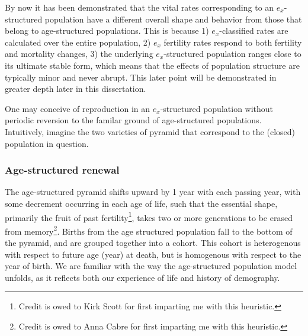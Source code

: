 
\label{sec:exstructuredrenewal}
By now it has been demonstrated that the vital rates corresponding to an
$e_x$-structured population have a different overall shape and behavior from
those that belong to age-structured populations. This is because 1) $e_x$-classified rates
are calculated over the entire population, 2) $e_x$ fertility rates respond to
both fertility and mortality changes, 3) the underlying $e_x$-structured
population ranges close to its ultimate stable form, which means that
the effects of population structure are typically minor and never abrupt. This
later point will be demonstrated in greater depth later in this dissertation.

One may conceive of reproduction in an $e_x$-structured population without
periodic reversion to the familar ground of age-structured populations.
Intuitively, imagine the two varieties of pyramid that correspond to the
(closed) population in question. 

\subsubsection{Age-structured renewal}
The age-structured pyramid shifts upward by 1 year with
each passing year, with some decrement occurring in each age of life, such that
the essential shape, primarily the fruit of past fertility\footnote{Credit is
owed to Kirk Scott for first imparting me with this heuristic.}, takes two or
more generations to be erased from memory\footnote{Credit is
owed to Anna Cabre for first imparting me with this heuristic.}. Births from the
age structured population fall to the bottom of the pyramid, and are grouped 
together into a cohort. This cohort is heterogenous with respect to future 
age (year) at death, but is
homogenous with respect to the year of birth. We are familiar with
the way the age-structured population model unfolds, as it
reflects both our experience of life and history of demography.

